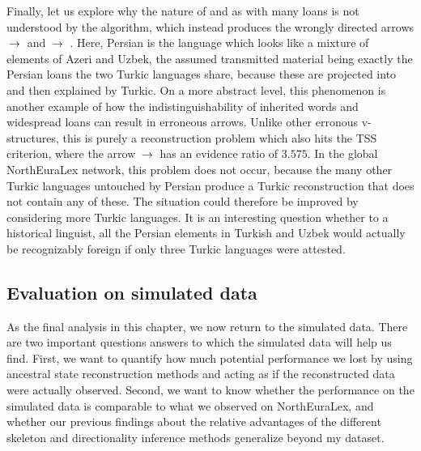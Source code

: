 Finally, let us explore why the nature of  and  as  with many  loans is not understood by the algorithm, which instead produces the wrongly directed arrows  $\kern 2pt\hbox{$\rightarrow$}\kern 2pt$  and  $\kern 2pt\hbox{$\rightarrow$}\kern 2pt$ . Here, Persian is the language which looks like a mixture of elements of Azeri and Uzbek, the assumed transmitted material being exactly the Persian loans the two Turkic languages share, because these are projected into and then explained by Turkic. On a more abstract level, this phenomenon is another example of how the indistinguishability of inherited words and widespread loans can result in erroneous arrows. Unlike other erronous v-structures, this is purely a reconstruction problem which also hits the TSS criterion, where the arrow  $\kern 2pt\hbox{$\rightarrow$}\kern 2pt$  has an evidence ratio of $3.575$. In the global NorthEuraLex network, this problem does not occur, because the many other Turkic languages untouched by Persian produce a Turkic reconstruction that does not 
contain any of these. The situation could therefore be improved by considering more Turkic languages. It is an interesting question whether to a historical linguist, all the Persian elements in Turkish and Uzbek would actually be recognizably foreign if only three Turkic languages were attested.

\subsection{Evaluation on simulated data}
As the final analysis in this chapter, we now return to the simulated data. There are two important questions answers to which the simulated data will help us find. First, we want to quantify how much potential performance we lost by using ancestral state reconstruction methods and acting as if the reconstructed data were actually observed. Second, we want to know whether the performance on the simulated data is comparable to what we observed on NorthEuraLex, and whether our previous findings about the relative advantages of the different skeleton and directionality inference methods generalize beyond my dataset.

